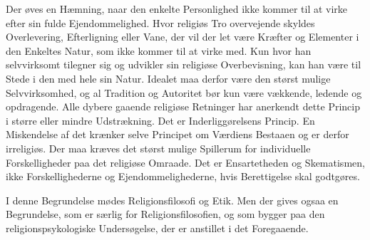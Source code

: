 \documentclass[12pt,a4paper,openany]{book}
\begin{document}
Der øves en Hæmning, naar den enkelte Personlighed ikke kommer til at
virke efter sin fulde Ejendommelighed. Hvor religiøs Tro overvejende
skyldes Overlevering, Efterligning eller Vane, der vil der let være
Kræfter og Elementer i den Enkeltes Natur, som ikke kommer til at virke
med. Kun hvor han selvvirksomt tilegner sig og udvikler sin religiøse
Overbevisning, kan han være til Stede i den med hele sin Natur. Idealet
maa derfor være den størst mulige Selvvirksomhed, og al Tradition og
Autoritet bør kun være vækkende, ledende og opdragende. Alle dybere
gaaende religiøse Retninger har anerkendt dette Princip i større eller
mindre Udstrækning. Det er Inderliggørelsens Princip. En Miskendelse af
det krænker selve Principet om Værdiens Bestaaen og er derfor
irreligiøs. Der maa kræves det størst mulige Spillerum for individuelle
Forskelligheder paa det religiøse Omraade. Det er Ensartetheden og
Skematismen, ikke Forskellighederne og Ejendommelighederne, hvis
Berettigelse skal godtgøres.

I denne Begrundelse mødes Religionsfilosofi og Etik. Men der gives ogsaa
en Begrundelse, som er særlig for Religionsfilosofien, og som bygger paa
den religionspsykologiske Undersøgelse, der er anstillet i det
Foregaaende.
\end{document}
